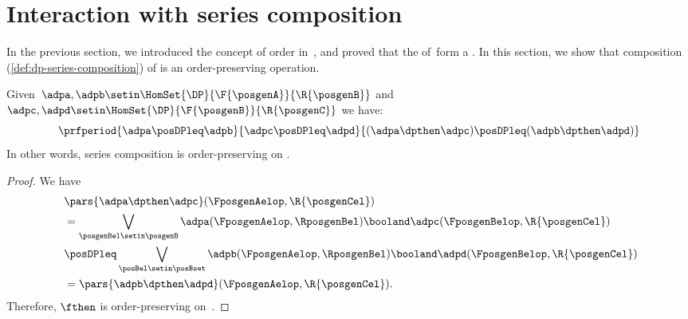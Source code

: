 
\section{Interaction with series composition}
In the previous section, we introduced the concept of order in~\DP, and proved that the  of~\DP form a .
In this section, we show that composition (\cref{def:dp-series-composition}) of  is an order-preserving operation.

\begin{lemma}
    \label{lem:series_pres_order}
    Given~$\adpa,\adpb \setin \HomSet{\DP}{\F{\posgenA}}{\R{\posgenB}}$ and~$\adpc,\adpd \setin \HomSet{\DP}{\F{\posgenB}}{\R{\posgenC}}$ we have:
    \begin{equation}
        \prfperiod{
            \adpa\posDPleq \adpb
        }{
            \adpc\posDPleq \adpd
        }{
            (\adpa\dpthen \adpc) \posDPleq (\adpb\dpthen \adpd)
        }
    \end{equation}
    In other words, series composition is order-preserving on \DP.
\end{lemma}
\begin{proof}
    We have
    \begin{equation}
        \label{eq:series_pres_ord}
        \begin{aligned}
            ~ & \pars{ \adpa\dpthen \adpc}(\FposgenAelop,\R{\posgenCel}) \\
              & = \bigvee_{\posgenBel\setin \posgenB}\adpa(\FposgenAelop,\RposgenBel)\booland \adpc(\FposgenBelop,\R{\posgenCel}) \\
              & \posDPleq \bigvee_{\posBel\setin \posBset} \adpb(\FposgenAelop,\RposgenBel)\booland \adpd(\FposgenBelop,\R{\posgenCel}) \\
              & =\pars{ \adpb\dpthen \adpd}(\FposgenAelop,\R{\posgenCel}).
        \end{aligned}
    \end{equation}
    Therefore, $\fthen$ is order-preserving on~\DP.
\end{proof}

